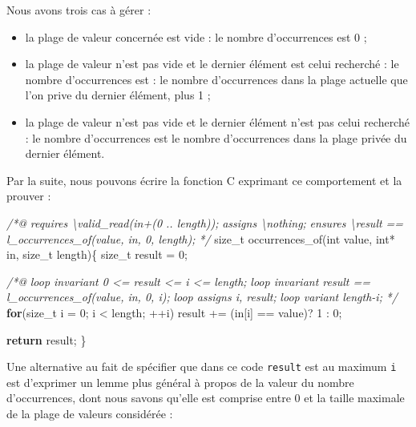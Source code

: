 \documentclass[12pt,francais,]{scrbook}
\newenvironment{Shaded}{}{}
\newcommand{\KeywordTok}[1]{\textcolor[rgb]{0.00,0.44,0.13}{\textbf{{#1}}}}
\newcommand{\DataTypeTok}[1]{\textcolor[rgb]{0.56,0.13,0.00}{{#1}}}
\newcommand{\DecValTok}[1]{\textcolor[rgb]{0.25,0.63,0.44}{{#1}}}
\newcommand{\CommentTok}[1]{\textcolor[rgb]{0.38,0.63,0.69}{\textit{{#1}}}}
\newcommand{\NormalTok}[1]{{#1}}
\providecommand{\tightlist}{%
  \setlength{\itemsep}{0pt}\setlength{\parskip}{0pt}}
\begin{document}
Nous avons trois cas à gérer :

\begin{itemize}
\tightlist
\item
  la plage de valeur concernée est vide : le nombre d'occurrences est 0
  ;
\item
  la plage de valeur n'est pas vide et le dernier élément est celui
  recherché : le nombre d'occurrences est : le nombre d'occurrences dans
  la plage actuelle que l'on prive du dernier élément, plus 1 ;
\item
  la plage de valeur n'est pas vide et le dernier élément n'est pas
  celui recherché : le nombre d'occurrences est le nombre d'occurrences
  dans la plage privée du dernier élément.
\end{itemize}

Par la suite, nous pouvons écrire la fonction C exprimant ce
comportement et la prouver :

\begin{footnotesize}\begin{Shaded}
\begin{Highlighting}[]
\CommentTok{/*@}
\CommentTok{  requires \textbackslash{}valid_read(in+(0 .. length));}
\CommentTok{  assigns  \textbackslash{}nothing;}
\CommentTok{  ensures  \textbackslash{}result == l_occurrences_of(value, in, 0, length);}
\CommentTok{*/}
\NormalTok{size_t occurrences_of(}\DataTypeTok{int} \NormalTok{value, }\DataTypeTok{int}\NormalTok{* in, size_t length)\{}
  \NormalTok{size_t result = }\DecValTok{0}\NormalTok{;}
  
  \CommentTok{/*@}
\CommentTok{    loop invariant 0 <= result <= i <= length;}
\CommentTok{    loop invariant result == l_occurrences_of(value, in, 0, i);}
\CommentTok{    loop assigns i, result;}
\CommentTok{    loop variant length-i;}
\CommentTok{  */}
  \KeywordTok{for}\NormalTok{(size_t i = }\DecValTok{0}\NormalTok{; i < length; ++i)}
    \NormalTok{result += (in[i] == value)? }\DecValTok{1} \NormalTok{: }\DecValTok{0}\NormalTok{;}

  \KeywordTok{return} \NormalTok{result;}
\NormalTok{\}}
\end{Highlighting}
\end{Shaded}\end{footnotesize}

Une alternative au fait de spécifier que dans ce code \texttt{result}
est au maximum \texttt{i} est d'exprimer un lemme plus général à propos
de la valeur du nombre d'occurrences, dont nous savons qu'elle est
comprise entre 0 et la taille maximale de la plage de valeurs considérée
:
\end{document}

